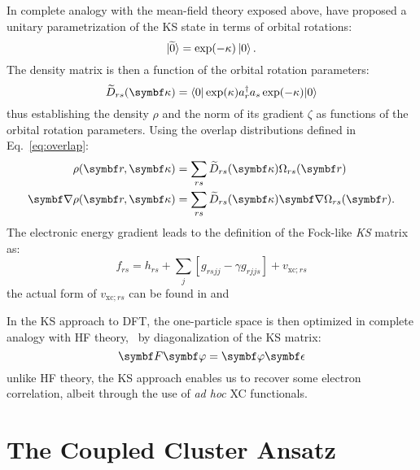 In complete analogy with the mean-field theory exposed above,
\citeauthor{Saue2002-cu} have proposed a unitary parametrization of the
\acrshort{KS} state in terms of orbital rotations:\autocite{Saue2002-cu}
\begin{equation}
 \ket{\widetilde{0}} = \exp(-\kappa)\ket{0}.
\end{equation}
The density matrix is then a function of the orbital rotation parameters:
\begin{equation}
 \widetilde{D}_{rs}(\vect{\kappa}) = \braket{0|\exp(\kappa)\cons{r}\anni{s}\exp(-\kappa)|0}
\end{equation}
thus establishing the density $\rho$ and the norm of its gradient
$\zeta$ as functions of the orbital rotation parameters.
Using the overlap distributions defined in Eq.~\eqref{eq:overlap}:
\begin{subequations}
 \begin{align}
   \rho(\vect{r},\vect{\kappa}) &= \sum_{rs}\widetilde{D}_{rs}(\vect{\kappa})\Omega_{rs}(\vect{r}) \\
   \vect{\nabla} \rho(\vect{r},\vect{\kappa}) &= \sum_{rs}\widetilde{D}_{rs}(\vect{\kappa})\vect{\nabla}\Omega_{rs}(\vect{r}).
 \end{align}
\end{subequations}
The electronic energy gradient leads to the definition of the Fock-like
\emph{KS} matrix as:
\begin{equation}\label{eq:ksmatrix}
  f_{rs} = h_{rs} + \sum_{j}[g_{rsjj} - \gamma g_{rjjs}] + v_{\mathrm{xc};rs}
\end{equation}
the actual form of $v_{\mathrm{xc};rs}$ can be found in
and 

In the \acrshort{KS} approach to \acrshort{DFT}, the one-particle space
is then optimized in complete analogy with \acrshort{HF} theory, \ie~by
diagonalization of the \acrshort{KS} matrix:
\begin{equation}
 \mat{F}\vect{\varphi} = \vect{\varphi}\mat{\epsilon}
\end{equation}
unlike \acrshort{HF} theory, the \acrshort{KS} approach enables us to
recover some electron correlation, albeit through the use of \emph{ad
hoc} \acrshort{XC} functionals.\autocite{Koch2015-wq}

\section{The Coupled Cluster Ansatz}\label{sec:coupled-cluster}

